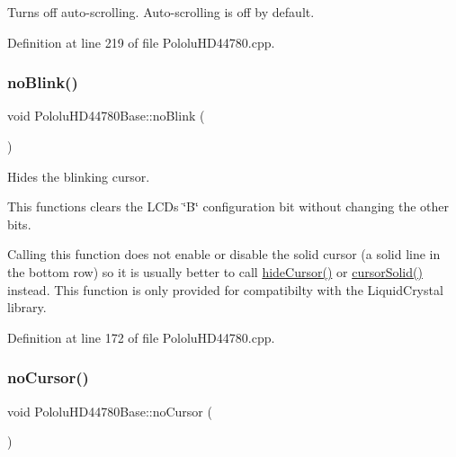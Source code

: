 Turns off auto-\/scrolling. Auto-\/scrolling is off by default. 

Definition at line 219 of file Pololu\+H\+D44780.\+cpp.

\mbox{\label{class_pololu_h_d44780_base_a301afc921881052b166e11cd45ad9696}} 
\subsubsection{\texorpdfstring{no\+Blink()}{noBlink()}}
{\footnotesize\ttfamily void Pololu\+H\+D44780\+Base\+::no\+Blink (\begin{DoxyParamCaption}{ }\end{DoxyParamCaption})\hspace{0.3cm}{\ttfamily [inherited]}}

Hides the blinking cursor.

This functions clears the L\+CD\textquotesingle{}s \char`\"{}\+B\char`\"{} configuration bit without changing the other bits.

Calling this function does not enable or disable the solid cursor (a solid line in the bottom row) so it is usually better to call \hyperlink{class_pololu_h_d44780_base_a1db083d254d251c479a577f29bcdcec8}{hide\+Cursor()} or \hyperlink{class_pololu_h_d44780_base_a6a4d8e79beda9f7c81659a8e13c8c338}{cursor\+Solid()} instead. This function is only provided for compatibilty with the Liquid\+Crystal library. 

Definition at line 172 of file Pololu\+H\+D44780.\+cpp.

\mbox{\label{class_pololu_h_d44780_base_ab40886cf0b563a1806bc9391d00b032d}} 
\subsubsection{\texorpdfstring{no\+Cursor()}{noCursor()}}
{\footnotesize\ttfamily void Pololu\+H\+D44780\+Base\+::no\+Cursor (\begin{DoxyParamCaption}{ }\end{DoxyParamCaption})\hspace{0.3cm}{\ttfamily [inherited]}}

